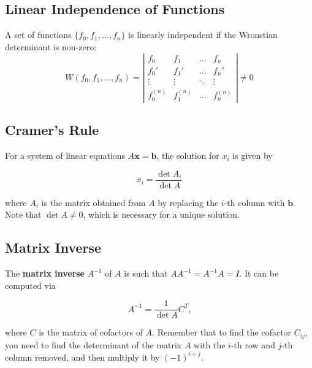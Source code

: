 \subsection{Linear Independence of Functions}

A set of functions $\{f_0, f_1, \dots, f_n\}$ is linearly independent if the Wronstian determinant is non-zero:
\begin{equation*}
    W(f_0, f_1, \dots, f_n) = \left|\begin{matrix}
        f_0       & f_1       & \dots  & f_n       \\
        f_0'      & f_1'      & \dots  & f_n'      \\
        \vdots    & \vdots    & \ddots & \vdots    \\
        f_0^{(n)} & f_1^{(n)} & \dots  & f_n^{(n)}
    \end{matrix}\right| \neq 0
\end{equation*}

\subsection{Cramer's Rule}

For a system of linear equations $A\mathbf{x} = \mathbf{b}$, the solution for $x_i$ is given by

\begin{equation*}
    x_i = \frac{\det A_i}{\det A}
\end{equation*}

where $A_i$ is the matrix obtained from $A$ by replacing the $i$-th column with $\mathbf{b}$. Note that $\det A \neq 0$, which is necessary for a unique solution.

\subsection{Matrix Inverse}

The \textbf{matrix inverse} $A^{-1}$ of $A$ is such that $AA^{-1} = A^{-1}A = I$. It can be computed via

\begin{equation*}
    A^{-1} = \frac{1}{\det A} C^T\text{,}
\end{equation*}

where $C$ is the matrix of cofactors of $A$. Remember that to find the cofactor $C_{ij}$, you need to find the determinant of the matrix $A$ with the $i$-th row and $j$-th column removed, and then multiply it by $(-1)^{i+j}$.

